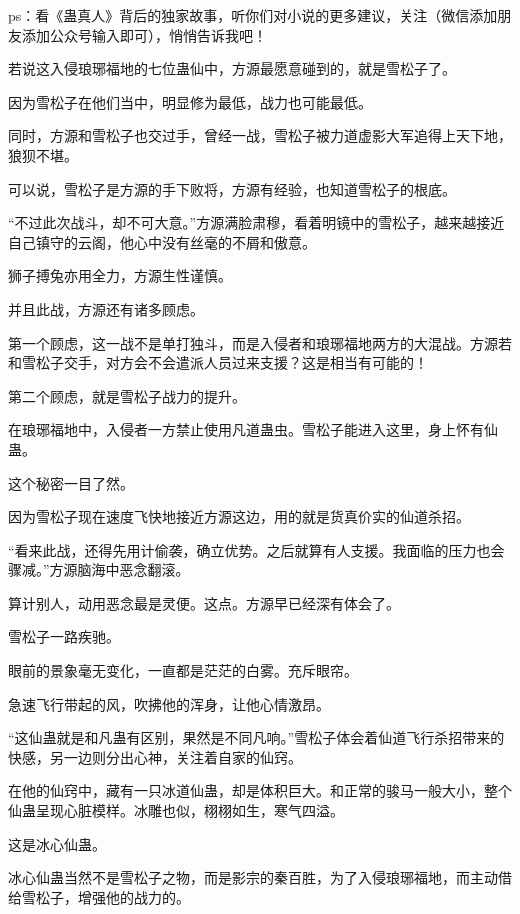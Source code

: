
\begin{this_body}



ps：看《蛊真人》背后的独家故事，听你们对小说的更多建议，关注（微信添加朋友添加公众号输入即可），悄悄告诉我吧！

若说这入侵琅琊福地的七位蛊仙中，方源最愿意碰到的，就是雪松子了。

因为雪松子在他们当中，明显修为最低，战力也可能最低。

同时，方源和雪松子也交过手，曾经一战，雪松子被力道虚影大军追得上天下地，狼狈不堪。

可以说，雪松子是方源的手下败将，方源有经验，也知道雪松子的根底。

“不过此次战斗，却不可大意。”方源满脸肃穆，看着明镜中的雪松子，越来越接近自己镇守的云阁，他心中没有丝毫的不屑和傲意。

狮子搏兔亦用全力，方源生性谨慎。

并且此战，方源还有诸多顾虑。

第一个顾虑，这一战不是单打独斗，而是入侵者和琅琊福地两方的大混战。方源若和雪松子交手，对方会不会遣派人员过来支援？这是相当有可能的！

第二个顾虑，就是雪松子战力的提升。

在琅琊福地中，入侵者一方禁止使用凡道蛊虫。雪松子能进入这里，身上怀有仙蛊。

这个秘密一目了然。

因为雪松子现在速度飞快地接近方源这边，用的就是货真价实的仙道杀招。

“看来此战，还得先用计偷袭，确立优势。之后就算有人支援。我面临的压力也会骤减。”方源脑海中恶念翻滚。

算计别人，动用恶念最是灵便。这点。方源早已经深有体会了。

雪松子一路疾驰。

眼前的景象毫无变化，一直都是茫茫的白雾。充斥眼帘。

急速飞行带起的风，吹拂他的浑身，让他心情激昂。

“这仙蛊就是和凡蛊有区别，果然是不同凡响。”雪松子体会着仙道飞行杀招带来的快感，另一边则分出心神，关注着自家的仙窍。

在他的仙窍中，藏有一只冰道仙蛊，却是体积巨大。和正常的骏马一般大小，整个仙蛊呈现心脏模样。冰雕也似，栩栩如生，寒气四溢。

这是冰心仙蛊。

冰心仙蛊当然不是雪松子之物，而是影宗的秦百胜，为了入侵琅琊福地，而主动借给雪松子，增强他的战力的。


\end{this_body}
